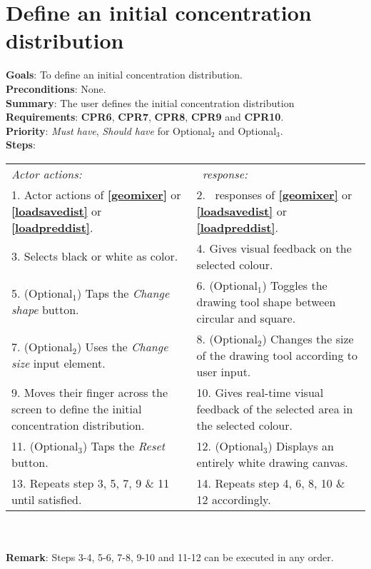   \section{Define an initial concentration distribution}
  \label{initdist}
  \textbf{Goals}: To define an initial concentration distribution.\\
  \textbf{Preconditions}: None. \\ %
  \textbf{Summary}: The user defines the initial concentration distribution\\
  \textbf{Requirements}: \textbf{CPR6}, \textbf{CPR7}, \textbf{CPR8}, \textbf{CPR9} and \textbf{CPR10}.\\
  \textbf{Priority}: \emph{Must have}, \emph{Should have} for Optional$_2$ and Optional$_3$.\\
  \textbf{Steps}: \\
  \begin{tabular}{ p{} p{} }
  	\emph{Actor actions:} & \emph{\projectname\ response:} \\
  	1. Actor actions of \textbf{\ref{geomixer}} or \textbf{\ref{loadsavedist}} or \textbf{\ref{loadpreddist}}. & 2. \projectname\ responses of \textbf{\ref{geomixer}} or \textbf{\ref{loadsavedist}} or  \textbf{\ref{loadpreddist}}.\\
	3. Selects black or white as color. & 4. Gives visual feedback on the selected colour. \\
	5. (Optional$_1$) Taps the \emph{Change shape} button. & 6. (Optional$_1$) Toggles the drawing tool shape between circular and square.\\
	7. (Optional$_2$) Uses the \emph{Change size} input element. & 8. (Optional$_2$) Changes the size of the drawing tool according to user input. \\
	9. Moves their finger across the screen to define the initial concentration distribution. & 10. Gives real-time visual feedback of the selected area in the selected colour.\\
	11. (Optional$_3$) Taps the \emph{Reset} button. & 12. (Optional$_3$) Displays an entirely white drawing canvas.\\

      13. Repeats step 3, 5, 7, 9 \& 11 until satisfied. & 14. Repeats step 4, 6, 8, 10 \& 12 accordingly. \\
      \end{tabular}
      \\
      \\\textbf{Remark}: Steps 3-4, 5-6, 7-8, 9-10 and 11-12 can be executed in any order.


